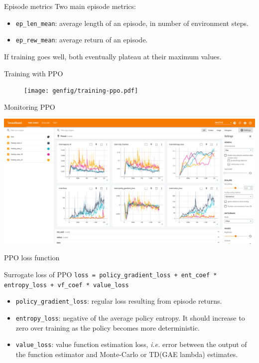 \documentclass[10pt, aspectratio=1610]{beamer}
\begin{document}
\begin{frame}{Episode metrics}
    Two main episode metrics:
    \begin{itemize}
        \item \texttt{ep_len_mean}: average length of an episode, in number of environment steps.
        \item \texttt{ep_rew_mean}: average return of an episode.
    \end{itemize}
    If training goes well, both eventually plateau at their maximum values.
\end{frame}

\begin{frame}{Training with PPO}
    \begin{figure}
        \texttt{[image: genfig/training-ppo.pdf]}
    \end{figure}
\end{frame}

\begin{frame}{Monitoring PPO}
   \begin{adjustbox}{width=\paperwidth, height=\paperheight, keepaspectratio, center}
        \includegraphics[width=\columnwidth]{figures/tensorboard-ppo.png}
   \end{adjustbox}
\end{frame}

\begin{frame}[fragile]{PPO loss function}
    \begin{block}{Surrogate loss of PPO}
        \texttt{loss = policy_gradient_loss + ent_coef * entropy_loss + vf_coef * value_loss}
    \end{block}
    \begin{itemize}
        \item \texttt{policy_gradient_loss}: regular loss resulting from episode returns.
        \item \texttt{entropy_loss}: negative of the average policy entropy. It should increase to zero over training as the policy becomes more deterministic.
        \item \texttt{value_loss}: value function estimation loss, \emph{i.e.} error between the output of the function estimator and Monte-Carlo or TD(GAE lambda) estimates.
    \end{itemize}
\end{frame}
\end{document}
